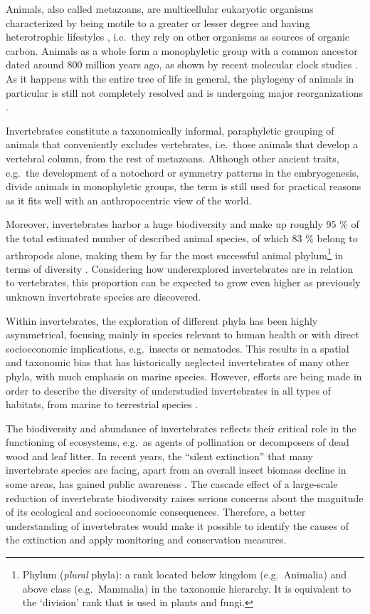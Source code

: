 \documentclass[
  openany]{book}
\begin{document}
Animals, also called metazoans, are multicellular eukaryotic organisms characterized by being motile to a greater or lesser degree \autocite{Arnellos2019} and having heterotrophic lifestyles \autocite{Mills2017}, i.e.~they rely on other organisms as sources of organic carbon. Animals as a whole form a monophyletic group with a common ancestor dated around 800 million years ago, as shown by recent molecular clock studies \autocite{Erwin2015}. As it happens with the entire tree of life in general, the phylogeny of animals in particular is still not completely resolved and is undergoing major reorganizations \autocite{Giribet2019}.

Invertebrates constitute a taxonomically informal, paraphyletic grouping of animals that conveniently excludes vertebrates, i.e.~those animals that develop a vertebral column, from the rest of metazoans. Although other ancient traits, e.g.~the development of a notochord or symmetry patterns in the embryogenesis, divide animals in monophyletic groups, the term is still used for practical reasons as it fits well with an anthropocentric view of the world.

Moreover, invertebrates harbor a huge biodiversity and make up roughly 95 \% of the total estimated number of described animal species, of which 83 \% belong to arthropods alone, making them by far the most successful animal phylum\footnote{Phylum (\emph{plural} phyla): a rank located below kingdom (e.g.~Animalia) and above class (e.g.~Mammalia) in the taxonomic hierarchy. It is equivalent to the `division' rank that is used in plants and fungi.} in terms of diversity \autocite{Zhang2013}. Considering how underexplored invertebrates are in relation to vertebrates, this proportion can be expected to grow even higher as previously unknown invertebrate species are discovered.

Within invertebrates, the exploration of different phyla has been highly asymmetrical, focusing mainly in species relevant to human health or with direct socioeconomic implications, e.g.~insects or nematodes. This results in a spatial and taxonomic bias that has historically neglected invertebrates of many other phyla, with much emphasis on marine species. However, efforts are being made in order to describe the diversity of understudied invertebrates in all types of habitats, from marine to terrestrial species \autocite{Lopez2014}.

The biodiversity and abundance of invertebrates reflects their critical role in the functioning of ecosystems, e.g.~as agents of pollination or decomposers of dead wood and leaf litter. In recent years, the ``silent extinction'' that many invertebrate species are facing, apart from an overall insect biomass decline in some areas, has gained public awareness \autocite{Hallmann2017,Eisenhauer2019}. The cascade effect of a large-scale reduction of invertebrate biodiversity raises serious concerns about the magnitude of its ecological and socioeconomic consequences. Therefore, a better understanding of invertebrates would make it possible to identify the causes of the extinction and apply monitoring and conservation measures.
\end{document}
